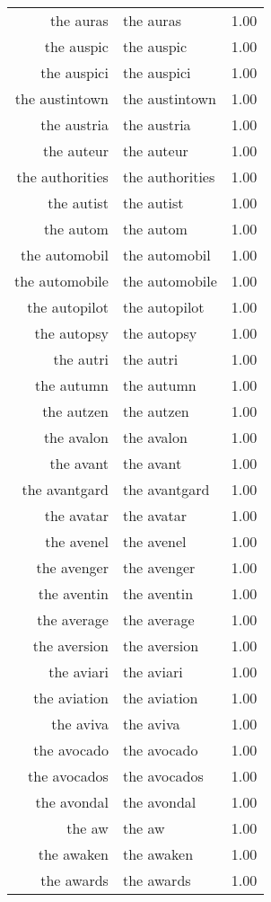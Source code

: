 \begin{table}[ht]
\begin{tabular}{rlr}
  the auras & the auras & 1.00 \\ 
  the auspic & the auspic & 1.00 \\ 
  the auspici & the auspici & 1.00 \\ 
  the austintown & the austintown & 1.00 \\ 
  the austria & the austria & 1.00 \\ 
  the auteur & the auteur & 1.00 \\ 
  the authorities & the authorities & 1.00 \\ 
  the autist & the autist & 1.00 \\ 
  the autom & the autom & 1.00 \\ 
  the automobil & the automobil & 1.00 \\ 
  the automobile & the automobile & 1.00 \\ 
  the autopilot & the autopilot & 1.00 \\ 
  the autopsy & the autopsy & 1.00 \\ 
  the autri & the autri & 1.00 \\ 
  the autumn & the autumn & 1.00 \\ 
  the autzen & the autzen & 1.00 \\ 
  the avalon & the avalon & 1.00 \\ 
  the avant & the avant & 1.00 \\ 
  the avantgard & the avantgard & 1.00 \\ 
  the avatar & the avatar & 1.00 \\ 
  the avenel & the avenel & 1.00 \\ 
  the avenger & the avenger & 1.00 \\ 
  the aventin & the aventin & 1.00 \\ 
  the average & the average & 1.00 \\ 
  the aversion & the aversion & 1.00 \\ 
  the aviari & the aviari & 1.00 \\ 
  the aviation & the aviation & 1.00 \\ 
  the aviva & the aviva & 1.00 \\ 
  the avocado & the avocado & 1.00 \\ 
  the avocados & the avocados & 1.00 \\ 
  the avondal & the avondal & 1.00 \\ 
  the aw & the aw & 1.00 \\ 
  the awaken & the awaken & 1.00 \\ 
  the awards & the awards & 1.00 \\ 

\end{tabular}
\end{table}
